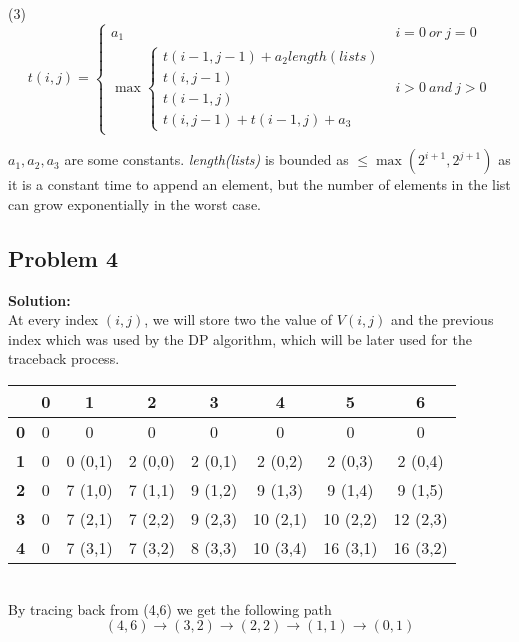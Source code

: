 \documentclass[12pt,a4paper]{article}
\newcommand{\solution}{\noindent\textbf{Solution:}\\\indent}
\begin{document}
(3)\begin{equation*}
    t(i,j) = \begin{cases}
    a_1 & i=0\ or\ j=0 \\
    \max\begin{cases}
        t(i-1,j-1) + a_2length(lists) \\
        t(i,j-1) \\
        t(i-1,j) \\
        t(i,j-1)+t(i-1,j) + a_3
    \end{cases} & i>0\ and\ j>0
    \end{cases}
\end{equation*}

$a_1,a_2,a_3$ are some constants. \textit{length(lists)} is bounded as $\leq \max(2^{i+1}, 2^{j+1})$ as it is a constant time to append an element, but the number of elements in the list can grow exponentially in the worst case.

\subsection*{Problem 4}
\solution
At every index $(i,j)$, we will store two the value of $V(i,j)$ and the previous index which was used by the DP algorithm, which will be later used for the traceback process. \\

\begin{tabular}{|c|c|c|c|c|c|c|c|}
\hline
& \textbf{0}& \textbf{1}& \textbf{2}& \textbf{3}& \textbf{4}& \textbf{5}& \textbf{6}\\
\hline
\textbf{0}& 0& 0& 0& 0& 0& 0& 0\\
\hline
\textbf{1}& 0& 0 (0,1)& 2 (0,0)& 2 (0,1)& 2 (0,2)& 2 (0,3)& 2 (0,4)\\
\hline
\textbf{2}& 0& 7 (1,0)& 7 (1,1)& 9 (1,2)& 9 (1,3)& 9 (1,4)& 9 (1,5)\\
\hline
\textbf{3}& 0& 7 (2,1)& 7 (2,2)& 9 (2,3)& 10 (2,1)& 10 (2,2)& 12 (2,3)\\
\hline
\textbf{4}& 0& 7 (3,1)& 7 (3,2)& 8 (3,3)& 10 (3,4)& 16 (3,1)& 16 (3,2)\\
\hline
\end{tabular} \\

By tracing back from (4,6) we get the following path
\begin{equation*}
    (4,6) \rightarrow (3,2) \rightarrow (2,2) \rightarrow (1,1) \rightarrow (0,1)
\end{equation*}
\end{document}
